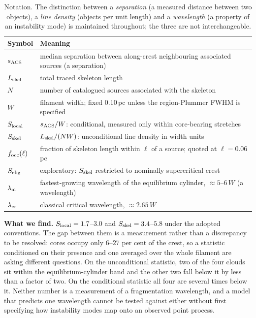 \documentclass[usenatbib,twoside,twocolumn]{mnras}
\begin{document}
\begin{table}
\caption{Notation. The distinction between a \emph{separation} (a measured distance between two objects), a \emph{line density} (objects per unit length) and a \emph{wavelength} (a property of an instability mode) is maintained throughout; the three are not interchangeable.}
\label{tab:notation}
\footnotesize
\setlength{\tabcolsep}{4pt}
\begin{tabular}{@{}lp{6.0cm}@{}}
\toprule
Symbol & Meaning \\
\midrule
$s_{\rm ACS}$ & median separation between along-crest neighbouring associated sources (a separation) \\
$L_{\rm skel}$ & total traced skeleton length \\
$N$ & number of catalogued sources associated with the skeleton \\
$W$ & filament width; fixed $0.10$\,pc unless the region-Plummer FWHM is specified \\
$S_{\rm local}$ & $s_{\rm ACS}/W$: conditional, measured only within core-bearing stretches \\
$S_{\rm skel}$ & $L_{\rm skel}/(NW)$: unconditional line density in width units \\
$f_{\rm occ}(\ell)$ & fraction of skeleton length within $\ell$ of a source; quoted at $\ell=0.06$\,pc \\
$S_{\rm elig}$ & exploratory: $S_{\rm skel}$ restricted to nominally supercritical crest \\
$\lambda_{\rm m}$ & fastest-growing wavelength of the equilibrium cylinder, $\approx5$--$6\,W$ (a wavelength) \\
$\lambda_{\rm cr}$ & classical critical wavelength, $\approx2.65\,W$ \\
\bottomrule
\end{tabular}
\end{table}

\smallskip\noindent\textbf{What we find.} $S_{\rm local}=1.7$--$3.0$ and $S_{\rm skel}=3.4$--$5.8$ under the adopted conventions. The gap between them is a measurement rather than a discrepancy to be resolved: cores occupy only $6$--$27$ per cent of the crest, so a statistic conditioned on their presence and one averaged over the whole filament are asking different questions. On the unconditional statistic, two of the four clouds sit within the equilibrium-cylinder band and the other two fall below it by less than a factor of two. On the conditional statistic all four are several times below it. Neither number is a measurement of a fragmentation wavelength, and a model that predicts one wavelength cannot be tested against either without first specifying how instability modes map onto an observed point process.
\end{document}
